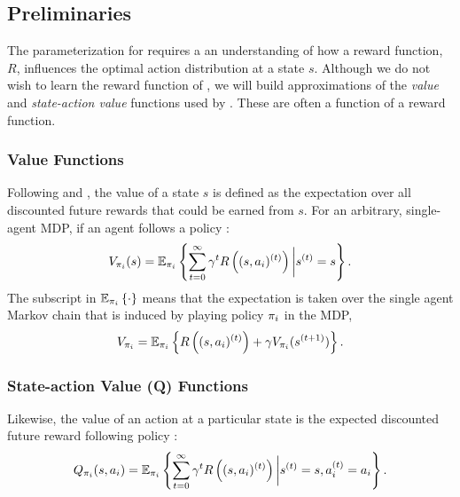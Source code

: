\subsection{Preliminaries}\label{sec:policy_iteration_preliminaries}
    The parameterization for  requires a an understanding of how a reward function, $R$, influences the
    optimal action distribution at a state $s$. Although we do not wish to learn the reward function of , we
    will build approximations of the \textit{value} and \textit{state-action value} functions used by . These
    are often a function of a reward function.

\subsubsection{Value Functions}
    Following \cite{hernandez2012adaptive} and \cite{Sugiyama2015StatisticalRL}, the value of a state $s$ is defined as
    the expectation over all discounted future rewards that could be earned from $s$. For an arbitrary, single-agent
    \ac{MDP}, if an agent  follows a policy :
    \[
    V_{\pi_{i}}(s) = \mathbb{E}_{\pi_{i}}\left\{\sum_{t=0}^{\infty} \gamma^t R\left((s,a_i)^{(t)}\right)
            \bigg|s^{(t)}=s\right\}.
    \]
    The subscript in $\mathbb{E}_{\pi_{i}}\left\{\cdot\right\}$ means that the expectation is taken over the single agent Markov
    chain that is induced by  playing policy $\pi_{i}$ in the \ac{MDP},
    \[
    V_{\pi_{i}} = \mathbb{E}_{\pi_{i}}\left\{R\left((s,a_i)^{(t)}\right) + \gamma V_{\pi_{i}}(s^{(t+1)})\right\}.
    \]

\subsubsection{State-action Value (Q) Functions}
    Likewise, the value of an action at a particular state is the expected discounted future reward following policy
    :
    \[
    Q_{\pi_{i}}(s,a_i) = \mathbb{E}_{\pi_{i}}\left\{\sum_{t=0}^{\infty} \gamma^t R\left((s,a_i)^{(t)}\right)
            \bigg|s^{(t)}=s, a_i^{(t)}=a_i\right\}.
    \]


